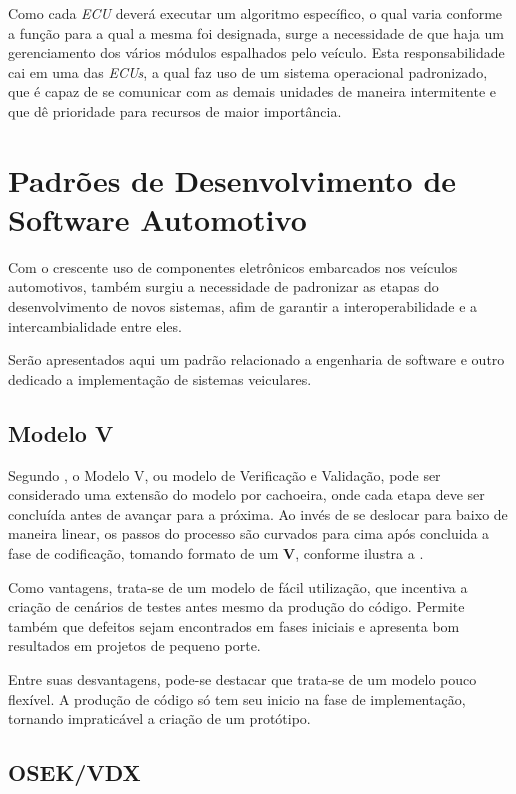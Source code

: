 Como cada \emph{ECU} deverá executar um algoritmo específico, o qual varia conforme a função para a qual a mesma foi designada, surge a necessidade de que haja um gerenciamento dos vários módulos espalhados pelo veículo. Esta responsabilidade cai em uma das \emph{ECUs}, a qual faz uso de um sistema operacional padronizado, que é capaz de se comunicar com as demais unidades de maneira intermitente e que dê prioridade para recursos de maior importância.

\section{Padrões de Desenvolvimento de Software Automotivo}

Com o crescente uso de componentes eletrônicos embarcados nos veículos automotivos, também surgiu a necessidade de padronizar as etapas do desenvolvimento de novos sistemas, afim de garantir a interoperabilidade e a intercambialidade entre eles.

Serão apresentados aqui um padrão relacionado a engenharia de software e outro dedicado a implementação de sistemas veiculares.

\subsection{Modelo V}

Segundo , o Modelo V, ou modelo de Verificação e Validação, pode ser considerado uma extensão do modelo por cachoeira, onde cada etapa deve ser concluída antes de avançar para a próxima. Ao invés de se deslocar para baixo de maneira linear, os passos do processo são curvados para cima após concluida a fase de codificação, tomando formato de um \textbf{V}, conforme ilustra a .


Como vantagens, trata-se de um modelo de fácil utilização, que incentiva a criação de cenários de testes antes mesmo da produção do código. Permite também que defeitos sejam encontrados em fases iniciais e apresenta bom resultados em projetos de pequeno porte.

Entre suas desvantagens, pode-se destacar que trata-se de um modelo pouco flexível. A produção de código só tem seu inicio na fase de implementação, tornando impraticável a criação de um protótipo.

\subsection{OSEK/VDX}

